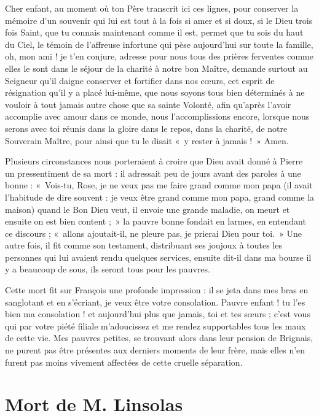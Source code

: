 \documentclass[11pt,a4paper]{report}
\begin{document}
Cher enfant, au moment où ton Père transcrit ici ces lignes, pour conserver la mémoire d'un souvenir qui lui est tout à la fois si amer et si doux, si le Dieu trois fois Saint, que tu connais maintenant comme il est, permet que tu sois du haut du Ciel, le témoin de l'affreuse infortune qui pèse aujourd'hui sur toute la famille, oh, mon ami ! je t'en conjure, adresse pour nous tous des prières ferventes comme elles le sont dans le séjour de la charité à notre bon Maître, demande surtout au Seigneur qu'il daigne conserver et fortifier dans nos cœurs, cet esprit de résignation qu'il y a placé lui-même, que nous soyons tous bien déterminés à ne vouloir à tout jamais autre chose que sa sainte Volonté, afin qu'après l'avoir accomplie avec amour dans ce monde, nous l'accomplissions encore, lorsque nous serons avec toi réunis dans la gloire dans le repos, dans la charité, de notre Souverain Maître, pour ainsi que tu le disait «~y rester à jamais !~» Amen.

Plusieurs circonstances nous porteraient à croire que Dieu avait donné à Pierre un pressentiment de sa mort : il adressait peu de jours avant des paroles à une bonne : «~Vois-tu, Rose, je ne veux pas me faire grand comme mon papa (il avait l'habitude de dire souvent : je veux être grand comme mon papa, grand comme la maison) quand le Bon Dieu veut, il envoie une grande maladie, on meurt et ensuite on est bien content ;~» la pauvre bonne fondait en larmes, en entendant ce discours ; «~allons ajoutait-il, ne pleure pas, je prierai Dieu pour toi.~» Une autre fois, il fit comme son testament, distribuant ses joujoux à toutes les personnes qui lui avaient rendu quelques services, ensuite dit-il dans ma bourse il y a beaucoup de sous, ils seront tous pour les pauvres.

Cette mort fit sur François une profonde impression : il se jeta dans mes bras en sanglotant et en s'écriant, je veux être votre consolation. Pauvre enfant ! tu l'es bien ma consolation ! et aujourd'hui plus que jamais, toi et tes sœurs ; c'est vous qui par votre piété filiale m'adoucissez et me rendez supportables tous les maux de cette vie. Mes pauvres petites, se trouvant alors dans leur pension de Brignais, ne purent pas être présentes aux derniers moments de leur frère, mais elles n'en furent pas moins vivement affectées de cette cruelle séparation.

\section*{Mort de M. Linsolas}
\end{document}
